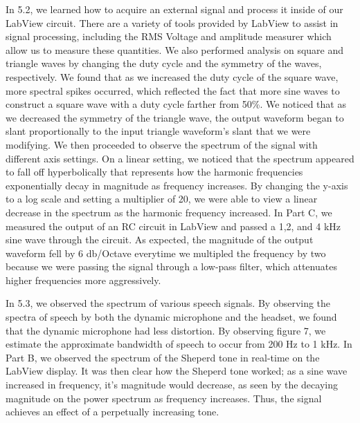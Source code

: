 \documentclass[10pt]{article}
\begin{document}
In 5.2, we learned how to acquire an external signal and process it inside of our LabView circuit. There are a variety of tools provided by LabView to assist in signal processing, including the RMS Voltage and amplitude measurer which allow us to measure these quantities. We also performed analysis on square and triangle waves by changing the duty cycle and the symmetry of the waves, respectively. We found that as we increased the duty cycle of the square wave, more spectral spikes occurred, which reflected the fact that more sine waves to construct a square wave with a duty cycle farther from 50\%. We noticed that as we decreased the symmetry of the triangle wave, the output waveform began to slant proportionally to the input triangle waveform's slant that we were modifying. 
We then proceeded to observe the spectrum of the signal with different axis settings. On a linear setting, we noticed that the spectrum appeared to fall off hyperbolically that represents how the harmonic frequencies exponentially decay in magnitude as frequency increases. By changing the y-axis to a log scale and setting a multiplier of 20, we were able to view a linear decrease in the spectrum as the harmonic frequency increased. 
In Part C, we measured the output of an RC circuit in LabView and passed a 1,2, and 4 kHz sine wave through the circuit. As expected, the magnitude of the output waveform fell by 6 db/Octave everytime we multipled the frequency by two because we were passing the signal through a low-pass filter, which attenuates higher frequencies more aggressively. 

In 5.3, we observed the spectrum of various speech signals. By observing the spectra of speech by both the dynamic microphone and the headset, we found that the dynamic microphone had less distortion. By observing figure 7, we estimate the approximate bandwidth of speech to occur from 200 Hz to 1 kHz. 
In Part B, we observed the spectrum of the Sheperd tone in real-time on the LabView display. It was then clear how the Sheperd tone worked; as a sine wave increased in frequency, it's magnitude would decrease, as seen by the decaying magnitude on the power spectrum as frequency increases. Thus, the signal achieves an effect of a perpetually increasing tone. 


\medskip


\end{document}
